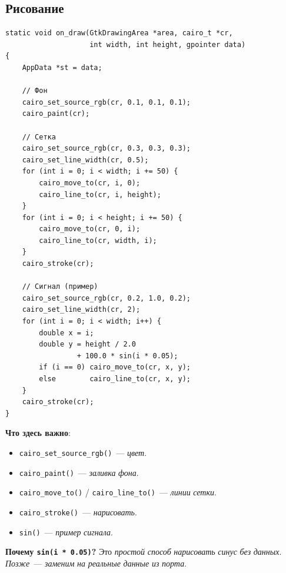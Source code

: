 \subsection{Рисование}

\begin{listing}[htbp]
\begin{verbatim}
static void on_draw(GtkDrawingArea *area, cairo_t *cr,
                    int width, int height, gpointer data)
{
    AppData *st = data;

    // Фон
    cairo_set_source_rgb(cr, 0.1, 0.1, 0.1);
    cairo_paint(cr);

    // Сетка
    cairo_set_source_rgb(cr, 0.3, 0.3, 0.3);
    cairo_set_line_width(cr, 0.5);
    for (int i = 0; i < width; i += 50) {
        cairo_move_to(cr, i, 0);
        cairo_line_to(cr, i, height);
    }
    for (int i = 0; i < height; i += 50) {
        cairo_move_to(cr, 0, i);
        cairo_line_to(cr, width, i);
    }
    cairo_stroke(cr);

    // Сигнал (пример)
    cairo_set_source_rgb(cr, 0.2, 1.0, 0.2);
    cairo_set_line_width(cr, 2);
    for (int i = 0; i < width; i++) {
        double x = i;
        double y = height / 2.0
                 + 100.0 * sin(i * 0.05);
        if (i == 0) cairo_move_to(cr, x, y);
        else        cairo_line_to(cr, x, y);
    }
    cairo_stroke(cr);
}
\end{verbatim}
\caption{\texttt{on\_draw()}~--- рисование осциллограммы}
\label{lst:gtk4-draw}
\end{listing}

\textbf{Что здесь важно}:
\begin{itemize}
    \item \texttt{cairo\_set\_source\_rgb()}~--- \emph{цвет}.
    \item \texttt{cairo\_paint()}~--- \emph{заливка} \emph{фона}.
    \item \texttt{cairo\_move\_to()} / \texttt{cairo\_line\_to()}~---
          \emph{линии} \emph{сетки}.
    \item \texttt{cairo\_stroke()}~--- \emph{нарисовать}.
    \item \texttt{sin()}~--- \emph{пример} \emph{сигнала}.
\end{itemize}

\begin{keybox}
\textbf{Почему \texttt{sin(i * 0.05)}?} Это \emph{простой}
\emph{способ} \emph{нарисовать} \emph{синус} \emph{без}
\emph{данных}. \emph{Позже}~--- \emph{заменим} \emph{на}
\emph{реальные} \emph{данные} \emph{из} \emph{порта}.
\end{keybox}

